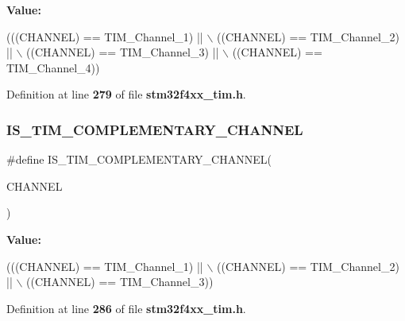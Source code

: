 {\bfseries Value\+:}
\begin{DoxyCode}
(((CHANNEL) == TIM_Channel_1) || \(\backslash\)
                                 ((CHANNEL) == TIM_Channel_2) || \(\backslash\)
                                 ((CHANNEL) == TIM_Channel_3) || \(\backslash\)
                                 ((CHANNEL) == TIM_Channel_4))
\end{DoxyCode}


Definition at line \textbf{ 279} of file \textbf{ stm32f4xx\+\_\+tim.\+h}.

\mbox{\label{group__TIM__Channel_ga6f44459b7dfc4138bbc2c3795311c48c}} 
\subsubsection{I\+S\+\_\+\+T\+I\+M\+\_\+\+C\+O\+M\+P\+L\+E\+M\+E\+N\+T\+A\+R\+Y\+\_\+\+C\+H\+A\+N\+N\+EL}
{\footnotesize\ttfamily \#define I\+S\+\_\+\+T\+I\+M\+\_\+\+C\+O\+M\+P\+L\+E\+M\+E\+N\+T\+A\+R\+Y\+\_\+\+C\+H\+A\+N\+N\+EL(\begin{DoxyParamCaption}\item[{}]{C\+H\+A\+N\+N\+EL }\end{DoxyParamCaption})}

{\bfseries Value\+:}
\begin{DoxyCode}
(((CHANNEL) == TIM_Channel_1) || \(\backslash\)
                                               ((CHANNEL) == TIM_Channel_2) || \(\backslash\)
                                               ((CHANNEL) == TIM_Channel_3))
\end{DoxyCode}


Definition at line \textbf{ 286} of file \textbf{ stm32f4xx\+\_\+tim.\+h}.

\mbox{\label{group__TIM__Channel_gacbf272b7a14f63b38bdbf18577835dce}} 
